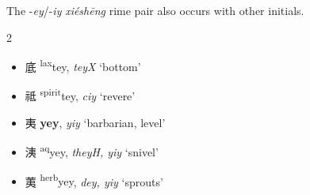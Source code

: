 The -\textit{ey}/-\textit{iy} \textit{xiéshēng} rime pair also occurs with other initials.  

\begin{multicols}{2}
\begin{itemize}
\raggedcolumns
    \item {\Large{底}} %
    {\large{{\textsuperscript{lax}tey}}},
    \textit{teyX} %
    `bottom'

    \item {\Large{祗}} %
    {\large{{\textsuperscript{spirit}tey}}},
    \textit{ciy} %
    `revere'

\end{itemize}

\medskip

\begin{itemize}

    \item {\Large{夷}} %
    {\large{\textbf{yey}}},
    \textit{yiy} %
    `barbarian, level'

    \item {\Large{洟}} %
    {\large{{\textsuperscript{aq}yey}}},
    \textit{theyH, yiy} %
    `snivel'

    \item {\Large{荑}} %
    {\large{{\textsuperscript{herb}yey}}},
    \textit{dey, yiy} %
    `sprouts'

\end{itemize}
\end{multicols}

\vspace{1mm}

